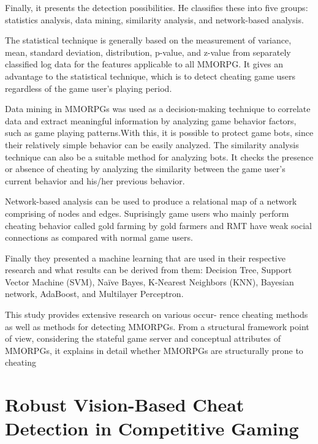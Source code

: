 Finally, it presents the detection possibilities. He classifies these into five groups: statistics analysis, data mining, similarity analysis, and network-based analysis.

The statistical technique is generally based on the measurement of variance, mean, standard deviation, distribution, p-value, and z-value from separately classified log data for the features applicable to all MMORPG. It gives an advantage to the statistical technique, which is to detect cheating game users regardless of the game user’s playing period.

Data mining in MMORPGs was used as a decision-making technique to correlate data and extract meaningful information by analyzing game behavior factors, such as game playing patterns.With this, it is possible to protect game bots, since their relatively simple behavior can be easily analyzed.
The similarity analysis technique can also be a suitable method for analyzing bots. It checks the presence or absence of cheating by analyzing the similarity between the game user’s current behavior and his/her previous behavior.

Network-based analysis can be used to produce a relational map of a network comprising of nodes and edges. Suprisingly game users who mainly perform cheating behavior called gold farming by gold farmers and RMT have weak social connections as compared with normal game users. 

Finally they presented a machine learning that are used in their respective research and what results
can be derived from them: Decision Tree, Support Vector Machine (SVM), Naïve Bayes, K-Nearest Neighbors (KNN), Bayesian network, AdaBoost, and Multilayer Perceptron.

This study provides extensive research on various occur- rence cheating methods as well as methods for detecting MMORPGs. From a structural framework point of view, considering the stateful game server and conceptual attributes of MMORPGs, it explains in detail whether MMORPGs are structurally prone to cheating

\section{Robust Vision-Based Cheat Detection in Competitive Gaming \cite{jonnalagadda2021robust}}


